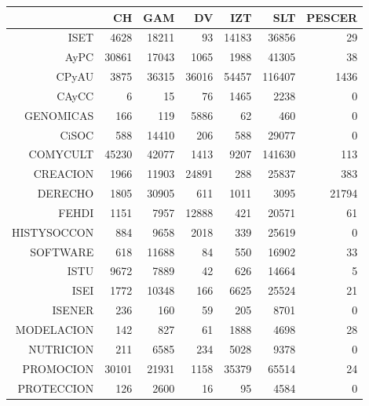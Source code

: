 \documentclass[12pt]{article}
\begin{document}
\begin{table}[ht]
\centering
\begin{tabular}{rrrrrrr}
  \hline
 & CH & GAM & DV & IZT & SLT & PESCER \\ 
  \hline
ISET & 4628 & 18211 &  93 & 14183 & 36856 &  29 \\ 
  AyPC & 30861 & 17043 & 1065 & 1988 & 41305 &  38 \\ 
  CPyAU & 3875 & 36315 & 36016 & 54457 & 116407 & 1436 \\ 
  CAyCC &   6 &  15 &  76 & 1465 & 2238 &   0 \\ 
  GENOMICAS & 166 & 119 & 5886 &  62 & 460 &   0 \\ 
  CiSOC & 588 & 14410 & 206 & 588 & 29077 &   0 \\ 
  COMYCULT & 45230 & 42077 & 1413 & 9207 & 141630 & 113 \\ 
  CREACION & 1966 & 11903 & 24891 & 288 & 25837 & 383 \\ 
  DERECHO & 1805 & 30905 & 611 & 1011 & 3095 & 21794 \\ 
  FEHDI & 1151 & 7957 & 12888 & 421 & 20571 &  61 \\ 
  HISTYSOCCON & 884 & 9658 & 2018 & 339 & 25619 &   0 \\ 
  SOFTWARE & 618 & 11688 &  84 & 550 & 16902 &  33 \\ 
  ISTU & 9672 & 7889 &  42 & 626 & 14664 &   5 \\ 
  ISEI & 1772 & 10348 & 166 & 6625 & 25524 &  21 \\ 
  ISENER & 236 & 160 &  59 & 205 & 8701 &   0 \\ 
  MODELACION & 142 & 827 &  61 & 1888 & 4698 &  28 \\ 
  NUTRICION & 211 & 6585 & 234 & 5028 & 9378 &   0 \\ 
  PROMOCION & 30101 & 21931 & 1158 & 35379 & 65514 &  24 \\ 
  PROTECCION & 126 & 2600 &  16 &  95 & 4584 &   0 \\ 
   \hline
\end{tabular}
\end{table}
\end{document}
